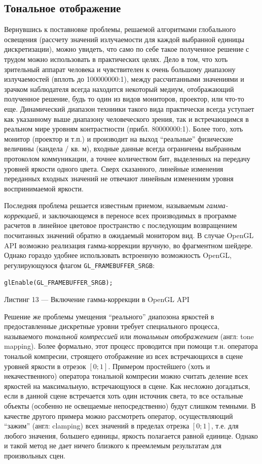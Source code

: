 \documentclass[12pt]{article}
\begin{document}
\subsection{Тональное отображение}
Вернувшись к поставновке проблемы, решаемой алгоритмами глобального освещения (рассчету значений излучаемости для каждой выбранной единицы дискретизации), можно увидеть, что само по себе такое полученное решение с трудом можно использовать в практических целях. Дело в том, что хоть зрительный аппарат человека и чувствителен к очень большому диапазону излучаемостей (вплоть до 100000000:1), между рассчитанными значениями и зрачком наблюдателя всегда находится некоторый медиум, отображающий полученное решение, будь то один из видов мониторов, проектор, или что-то еще. Динамический диапазон техниики такого вида практически всегда уступает как указанному выше диапазону человеческого зрения, так и встречающимся в реальном мире уровням контрастности (прибл. 80000000:1). Более того, хоть монитор (проектор и т.п.) и производит на выход ``реальные'' физические величины (кандела / кв. м), входные данные всегда ограничены выбранным протоколом коммуникации, а точнее количеством бит, выделенных на передачу уровней яркости одного цвета. Сверх сказанного, линейные изменения переданных входных значений не отвечают линейным изменениям уровня воспринимаемой яркости.

Последняя проблема решается известным приемом, называемым \emph{гамма-коррекцией}, и заключающемся в переносе всех производимых в программе расчетов в линейное цветовое пространство с последующим возвращением посчитанных значений обратно в ожидаемый монитором вид. В случае OpenGL API возможно реализация гамма-коррекции вручную, во фрагментном шейдере. Однако гораздо удобнее использовать встроенную возможность OpenGL, регулирующуюся флагом \texttt{GL\_FRAMEBUFFER\_SRGB}:
\begin{lstlisting}
glEnable(GL_FRAMEBUFFER_SRGB);
\end{lstlisting}
\begin{center}Листинг 13 --- Включение гамма-коррекции в OpenGL API \end{center}

Решение же проблемы умещения ``реального'' диапозона яркостей в предоставленные дискретные уровни требует специального процесса, называемого \emph{тональной компрессией} или \emph{тональным отображением} (англ: tone mapping). Более формально, этот процесс проводится при помощи т.н. оператора тональой компресии, строящего отображение из всех встречающихся в сцене уровней яркости в отрезок $[0; 1]$. Примером простейшего (хоть и некачественного) оператора тональной компресии можно считать деление всех яркостей на максимальную, встречающуюся в сцене. Как несложно догадаться, если в данной сцене встречается хоть один источник света, то все остальные объекты (особенно не освещаемые непосредственно) будут слишком темными. В качестве другого примера можно рассмотреть оператор, осуществляющий ``зажим'' (англ: clamping) всех значений в пределах отрезка $[0; 1]$, т.е. для любого значения, большего единицы, яркость полагается равной единице. Однако и такой метод не дает ничего близкого к преемлемым результатам для произвольных сцен.
\end{document}
